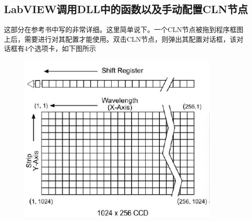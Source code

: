 \subsection{LabVIEW调用DLL中的函数以及手动配置CLN节点}
这部分在参考书中写的非常详细。这里简单说下。一个CLN节点被拖到程序框图上后，需要进行对其配置才能使用。双击CLN节点，则弹出其配置对话框，该对话框有4个选项卡，如下图所示
\begin{figure}[htbp]
\centering
\includegraphics[width=0.9\textwidth]{pictures/1.png}
\end{figure}

